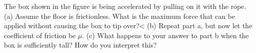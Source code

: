 The box shown in the figure is being accelerated by
pulling on it with the rope.\hwendpart
(a) Assume the floor is frictionless.
What is the maximum force that can be applied without causing
the box to tip over?<%
(b) Repeat part a, but now let the coefficient of friction
be $\mu$.\answercheck\hwendpart
(c) What happens to your answer to part b when the box is sufficiently
tall? How do you interpret this?
